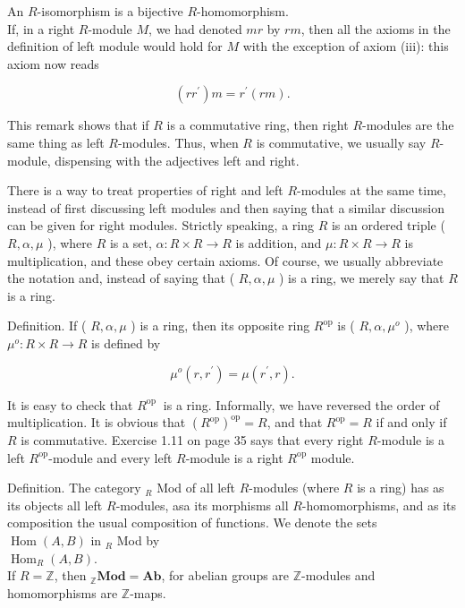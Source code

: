 \documentclass[10pt, letterpaper]{article}
\begin{document}
An $R$-isomorphism is a bijective $R$-homomorphism.\\
If, in a right $R$-module $M$, we had denoted $m r$ by $r m$, then all the axioms in the definition of left module would hold for $M$ with the exception of axiom (iii): this axiom now reads

$$
\left(r r^{\prime}\right) m=r^{\prime}(r m) .
$$

This remark shows that if $R$ is a commutative ring, then right $R$-modules are the same thing as left $R$-modules. Thus, when $R$ is commutative, we usually say $R$-module, dispensing with the adjectives left and right.

There is a way to treat properties of right and left $R$-modules at the same time, instead of first discussing left modules and then saying that a similar discussion can be given for right modules. Strictly speaking, a ring $R$ is an ordered triple ( $R, \alpha, \mu$ ), where $R$ is a set, $\alpha: R \times R \rightarrow R$ is addition, and $\mu: R \times R \rightarrow R$ is multiplication, and these obey certain axioms. Of course, we usually abbreviate the notation and, instead of saying that ( $R, \alpha, \mu$ ) is a ring, we merely say that $R$ is a ring.

Definition. If ( $R, \alpha, \mu$ ) is a ring, then its opposite ring $R^{\mathrm{op}}$ is ( $R, \alpha, \mu^{o}$ ), where $\mu^{o}: R \times R \rightarrow R$ is defined by

$$
\mu^{o}\left(r, r^{\prime}\right)=\mu\left(r^{\prime}, r\right) .
$$

It is easy to check that $R^{\text {op }}$ is a ring. Informally, we have reversed the order of multiplication. It is obvious that $\left(R^{\mathrm{op}}\right)^{\mathrm{op}}=R$, and that $R^{\mathrm{op}}=R$ if and only if $R$ is commutative. Exercise 1.11 on page 35 says that every right $R$-module is a left $R^{\mathrm{op}}$-module and every left $R$-module is a right $R^{\mathrm{op}}$ module.

Definition. The category ${ }_{R}$ Mod of all left $R$-modules (where $R$ is a ring) has as its objects all left $R$-modules, asa its morphisms all $R$-homomorphisms, and as its composition the usual composition of functions. We denote the sets $\operatorname{Hom}(A, B)$ in ${ }_{R}$ Mod by\\
$\operatorname{Hom}_{R}(A, B)$.\\
If $R=\mathbb{Z}$, then ${ }_{\mathbb{Z}} \mathbf{M o d}=\mathbf{A b}$, for abelian groups are $\mathbb{Z}$-modules and homomorphisms are $\mathbb{Z}$-maps.
\end{document}
